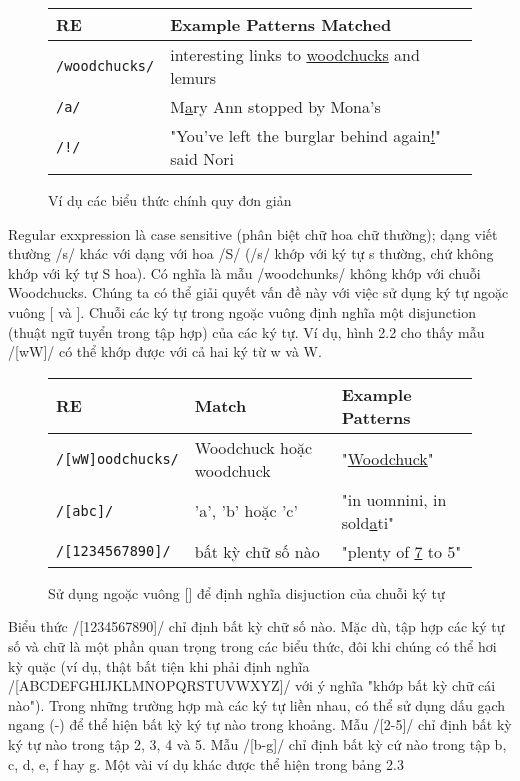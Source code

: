 \begin{figure}[h]
	\begin{tabular}{ l l }
	 \hline
	 RE & Example Patterns Matched \\
	 \hline
	 \verb|/woodchucks/| & interesting links to \underline{woodchucks} and lemurs \\
	 \verb|/a/| & M\underline{a}ry Ann stopped by Mona's  \\
	 \verb|/!/| & "You've left the burglar behind again\underline{!}" said Nori \\
	 \hline
	\end{tabular}
 \caption{Ví dụ các biểu thức chính quy đơn giản}
 \label{table:1}
\end{figure}

Regular exxpression là case sensitive (phân biệt chữ hoa chữ thường); dạng viết thường /s/ khác với dạng với hoa /S/ (/s/ khớp với ký tự s thường, chứ không khớp với ký tự S hoa). Có nghĩa là mẫu /woodchunks/ không khớp với chuỗi Woodchucks. Chúng ta có thể giải quyết vấn đề này với việc sử dụng ký tự ngoặc vuông [ và ]. Chuỗi các ký tự trong ngoặc vuông định nghĩa một disjunction (thuật ngữ tuyển trong tập hợp) của các ký tự. Ví dụ, hình 2.2 cho thấy mẫu /[wW]/ có thể khớp được với cả hai ký từ w và W.

\begin{figure}[h]
	\begin{tabular}{ l l l }
	 \hline
	 RE & Match & Example Patterns \\
	 \hline
	 \verb|/[wW]oodchucks/| & Woodchuck hoặc woodchuck & "\underline{Woodchuck}" \\
	 \verb|/[abc]/| & 'a', 'b' hoặc 'c' & "in uomnini, in sold\underline{a}ti" \\
	 \verb|/[1234567890]/| & bất kỳ chữ số nào & "plenty of \underline{7} to 5"
	 \hline
	\end{tabular}
 \caption{Sử dụng ngoặc vuông [] để định nghĩa disjuction của chuỗi ký tự}
 \label{table:2}
\end{figure}

Biểu thức /[1234567890]/ chỉ định bất kỳ chữ số nào. Mặc dù, tập hợp các ký tự số và chữ là một phần quan trọng trong các biểu thức, đôi khi chúng có thể hơi kỳ quặc (ví dụ, thật bất tiện khi phải định nghĩa /[ABCDEFGHIJKLMNOPQRSTUVWXYZ]/ với ý nghĩa "khớp bất kỳ chữ cái nào"). Trong những trường hợp mà các ký tự liền nhau, có thể sử dụng dấu gạch ngang (-) để thể hiện bất kỳ ký tự nào trong khoảng. Mẫu /[2-5]/ chỉ định bất kỳ ký tự nào trong tập 2, 3, 4 và 5. Mẫu /[b-g]/ chỉ định bất kỳ cứ nào trong tập b, c, d, e, f hay g. Một vài ví dụ khác được thể hiện trong bảng 2.3

